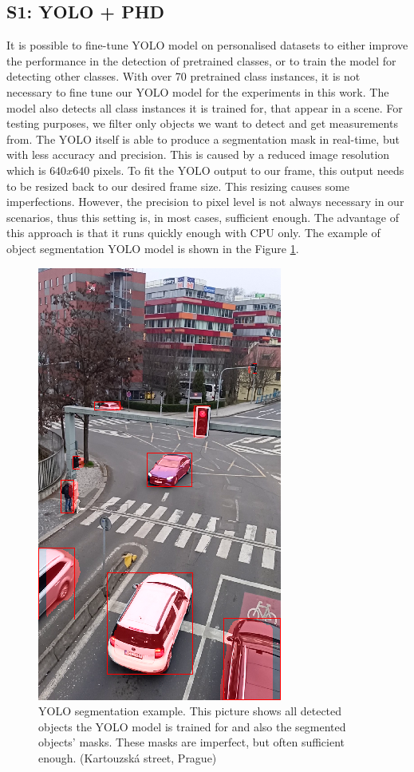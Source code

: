 \subsection{S1: YOLO + PHD}
It is possible to fine-tune YOLO model on personalised datasets to either improve the performance in the
detection of
pretrained classes, or to train the model for detecting other classes. With over 70 pretrained class instances, it is
not necessary to fine tune our YOLO model for the experiments in this work. The model also detects all class
instances it is trained for, that appear in a scene. For testing purposes, we filter only objects we want to detect
and get
measurements from. The YOLO itself is able to produce a segmentation mask in real-time, but with less
accuracy
and
precision. This is caused by a reduced image resolution which is $640x640$ pixels. To fit the YOLO output
to our
frame,
this output needs to be resized back to our desired frame size. This resizing causes some imperfections. However, the
precision
to pixel level is not always necessary in our scenarios, thus this setting is, in most cases, sufficient
enough. The advantage of this approach is that it runs quickly enough with CPU only. The example of
object segmentation YOLO model is shown in the Figure \ref{fig:yolo_seg}.
\begin{figure}[h]
  \centering
  \includegraphics[width=0.35\linewidth]{text/chapter_04/imgs/YOLO_screenshot_2}
  \caption{YOLO segmentation example. This picture shows all detected objects the YOLO model is trained for and also
  the segmented objects' masks. These masks are imperfect, but often sufficient enough. (Kartouzská street, Prague)}
  \label{fig:yolo_seg}
\end{figure}

